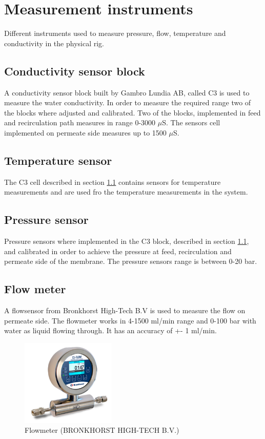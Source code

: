 \section{Measurement instruments} 
\label{measure}
Different instruments used to measure pressure, flow, temperature and conductivity in the physical rig.

\subsection{Conductivity sensor block}
\label{senscond}
A conductivity sensor block built by Gambro Lundia AB, called C3 is used to measure the water conductivity. In order to measure the required range two of the blocks where adjusted and calibrated. Two of the blocks, implemented in feed and recirculation path measures in range 0-3000 $\mu$S. The sensors cell implemented on permeate side measures up to 1500 $\mu$S.

\subsection{Temperature sensor}
\label{senstemp}
The C3 cell described in section \ref{senscond} contains sensors for temperature measurements and are used fro the temperature measurements in the system.

\subsection{Pressure sensor}
\label{senspress}
Pressure sensors where implemented in the C3 block, described in section \ref{senscond}, and calibrated in order to achieve the pressure at feed, recirculation and permeate side of the membrane. The pressure sensors range is between 0-20 bar.


\subsection{Flow meter}
\label{sensflow}
A flowsensor from Bronkhorst High-Tech B.V is used to measure the flow on permeate side. The flowmeter works in 4-1500 ml/min range and 0-100 bar with water as liquid flowing through. It has an accuracy of +- 1 ml/min. 

\begin{figure}[h]
    \centering
    \includegraphics[width=0.4\textwidth]{Flowmeter}
    \caption{Flowmeter (BRONKHORST HIGH-TECH B.V.)}
    \label{fig:flowmeter}
\end{figure}









